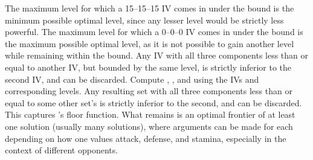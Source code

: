 The maximum level for which a 15--15--15 IV comes in under the bound is the
 minimum possible optimal level, since any lesser level would be strictly less
 powerful.
The maximum level for which a 0--0--0 IV comes in under the bound is the
 maximum possible optimal level, as it is not possible to gain another level
 while remaining within the bound.
Any IV with all three components less than or equal to another IV, but bounded
 by the same level, is strictly inferior to the second IV, and can be discarded.
Compute , , and \MHP{} using the IVs and corresponding levels.
Any resulting set with all three components less than or equal to some other set's
 is strictly inferior to the second, and can be discarded.
This captures \MHP{}'s floor function.
What remains is an optimal frontier of at least one solution (usually
 many solutions), where arguments can be made for each depending on how one
 values attack, defense, and stamina, especially in the context of different
 opponents.

